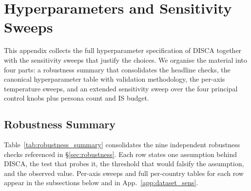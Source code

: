 \documentclass{article}
\begin{document}
\section{Hyperparameters and Sensitivity Sweeps}
\label{app:robustness_summary}
\label{app:hyperparams}
\label{app:temp_sensitivity}
\label{app:r2_hparam_sensitivity}

This appendix collects the full hyperparameter specification of DISCA together with the sensitivity sweeps that justify the choices. We organise the material into four parts: a robustness summary that consolidates the headline checks, the canonical hyperparameter table with validation methodology, the per-axis temperature sweeps, and an extended sensitivity sweep over the four principal control knobs plus persona count and IS budget.

\subsection{Robustness Summary}

Table~\ref{tab:robustness_summary} consolidates the nine independent robustness checks referenced in §\ref{sec:robustness}. Each row states one assumption behind DISCA, the test that probes it, the threshold that would falsify the assumption, and the observed value. Per-axis sweeps and full per-country tables for each row appear in the subsections below and in App.~\ref{app:dataset_sens}.
\end{document}
